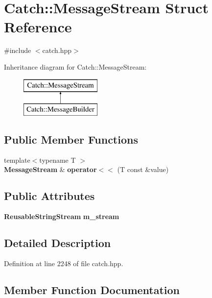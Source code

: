 \section{Catch\+::Message\+Stream Struct Reference}
\label{struct_catch_1_1_message_stream}


{\ttfamily \#include $<$catch.\+hpp$>$}

Inheritance diagram for Catch\+::Message\+Stream\+:\begin{figure}[H]
\begin{center}
\leavevmode
\includegraphics[height=2.000000cm]{struct_catch_1_1_message_stream}
\end{center}
\end{figure}
\subsection*{Public Member Functions}
\begin{DoxyCompactItemize}
\item 
{\footnotesize template$<$typename T $>$ }\\\textbf{ Message\+Stream} \& \textbf{ operator$<$$<$} (T const \&value)
\end{DoxyCompactItemize}
\subsection*{Public Attributes}
\begin{DoxyCompactItemize}
\item 
\textbf{ Reusable\+String\+Stream} \textbf{ m\+\_\+stream}
\end{DoxyCompactItemize}


\subsection{Detailed Description}


Definition at line 2248 of file catch.\+hpp.



\subsection{Member Function Documentation}
\mbox{\label{struct_catch_1_1_message_stream_a554c4aff5925a077e9fe9d858217428d}} 

